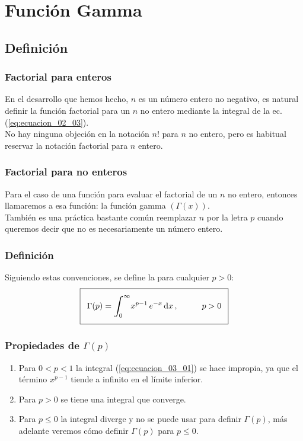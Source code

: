 \documentclass[12pt]{beamer}
\begin{document}
\section{Función Gamma}
\subsection{Definición}

\begin{frame}
\frametitle{Factorial para enteros}
En el desarrollo que hemos hecho, $n$ es un número entero no negativo, es natural definir la función factorial para un $n$ no entero mediante la integral de la ec.(\ref{eq:ecuacion_02_03}).
\\
\bigskip
\pause
No hay ninguna objeción en la notación $n!$ para $n$ no entero, pero es habitual reservar la notación factorial para $n$ entero.
\end{frame}
\begin{frame}
\frametitle{Factorial para no enteros}
Para el caso de una función para evaluar el factorial de un $n$ no entero, entonces llamaremos a esa función: la función gamma $(\Gamma (x))$.
\\
\bigskip
\pause
También es una práctica bastante común reemplazar $n$ por la letra $p$ cuando queremos decir que no es necesariamente un número entero.
\end{frame}
\begin{frame}
\frametitle{Definición}
Siguiendo estas convenciones, se define la  para cualquier $p > 0$:
\pause
\begin{align}\addtolength{\fboxsep}{5pt}\boxed{
\Gamma (p) = \scaleint{6ex}_{\bs 0}^{\infty} x^{p-1} \, e^{-x} \dd{x}, \hspace{1cm} p > 0}
\label{eq:ecuacion_03_01}
\end{align}
\end{frame}
\begin{frame}
\frametitle{Propiedades de $\Gamma (p)$}
\begin{enumerate}[<+->]
\item Para $0 < p < 1$ la integral (\ref{eq:ecuacion_03_01}) se hace impropia, ya que el término $x^{p-1}$ tiende a infinito en el límite inferior.
\item Para $p > 0$ se tiene una integral que converge.
\item Para $p \leq 0$ la integral diverge y no se puede usar para definir $\Gamma (p)$, más adelante veremos cómo definir  $\Gamma (p)$ para $p \leq 0$.
\end{enumerate}
\end{frame}
\end{document}
